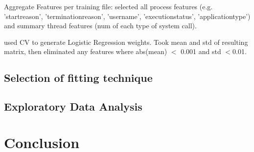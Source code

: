 \documentclass[11pt, oneside]{article}   	%
\begin{document}
Aggregate Features per training file:
 selected all process features  (e.g. 'startreason', 'terminationreason', 'username', 'executionstatus', 'applicationtype') and summary thread features (num of each type of system call).

used CV to generate Logistic Regression weights. Took mean and std of resulting matrix, then eliminated any features where abs(mean) $<$ 0.001 and std $< $0.01.



\subsection*{Selection of fitting technique}

\subsection*{Exploratory Data Analysis}

\section*{Conclusion}
\end{document}
